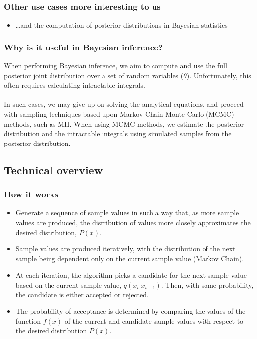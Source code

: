 \documentclass[11pt]{beamer}
\begin{document}
\begin{frame}
	\frametitle{Other use cases more interesting to us}
	\begin{itemize}
			\item \dots and the computation of posterior distributions in Bayesian statistics
	\end{itemize}
\end{frame}


\begin{frame}
	\frametitle{Why is it useful in Bayesian inference?}
	When performing Bayesian inference, we aim to compute and use the full posterior joint distribution over a set of random variables ($\theta$). Unfortunately, this often requires calculating intractable integrals. \\~\\
	In such cases, we may give up on solving the analytical equations,
and proceed with sampling techniques based upon Markov Chain Monte Carlo (MCMC) methods, such as MH. When using MCMC methods, we estimate the posterior distribution and the intractable integrals using simulated samples from the posterior distribution.
\end{frame}


\subsection{Technical overview}


\begin{frame}
	\frametitle{How it works}
	\begin{itemize}
	\item Generate a sequence of sample values in such a way that, as more sample values are produced, the distribution of values more closely approximates the desired distribution, $P(x)$.
	\item Sample values are produced iteratively, with the distribution of the next sample being dependent only on the current sample value (Markov Chain).
	\item At each iteration, the algorithm picks a candidate for the next sample value based on the current sample value, $q(x_{i} | x_{i - 1})$. Then, with some probability, the candidate is either accepted or rejected.
	\item The probability of acceptance is determined by comparing the values of the function $f(x)$ of the current and candidate sample values with respect to the desired distribution $P(x)$.	
	\end{itemize}	 
\end{frame}
\end{document}

